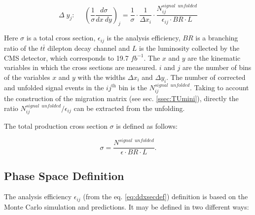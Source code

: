 \begin{equation}\label{eq:ddxsecdef}
 \Delta\;y_{j}: \:\:\:\:\:\:(\frac{1}{\sigma} \frac{d\sigma}{dx\:dy})_{j} = \frac{1}{\sigma} \cdot \frac{1}{\Delta x_{i}} \cdot \frac{N^{signal\:\;unfolded}_{ij}}{\epsilon_{ij} \cdot BR \cdot L}
\end{equation}

Here $\sigma$ is a total cross section, $\epsilon_{ij}$ is the analysis efficiency, $BR$ is a branching ratio of the $t\bar{t}$ dilepton decay channel and $L$ is the luminosity
collected by the CMS detector, which corresponds to 19.7 $fb^{-1}$. The $x$ and $y$ are the kinematic variables in which the cross sections 
are measured. $i$ and $j$ are the number of bins of the variables $x$ and $y$ with the widths $\Delta x_{i}$ and $\Delta y_{i}$.
The number of corrected and unfolded signal events in the $ij^{\textrm{th}}$ bin is the $N^{signal\:\;unfolded}_{ij}$.
Taking to account the construction of the migration matrix (see sec. \ref{ssec:TUmini}), directly the ratio
$N^{signal\:\;unfolded}_{ij} / \epsilon_{ij}$ can be extracted from the unfolding.

The total production cross section $\sigma$ is defined as follows:

\begin{equation}
 \sigma = \frac{N^{signal\;\:unfolded}}{\epsilon \cdot BR \cdot L}.
\end{equation}

\subsection{Phase Space Definition}

The analysis efficiency $\epsilon_{ij}$ (from the eq. \ref{eq:ddxsecdef}) definition is based on the Monte Carlo simulation and predictions.
It may be defined in two different ways:

